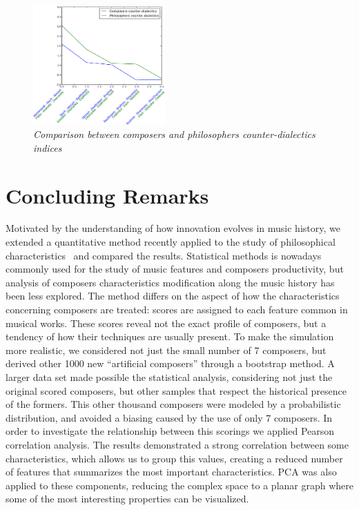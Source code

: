 \documentclass[
 aip,
 jmp,
 amsmath,amssymb,
 reprint,
]{revtex4-1}
\begin{document}
\begin{figure}[ht]
        \begin{center}
                \includegraphics[width=0.45\textwidth]{compara_dialeticas2}
        \end{center}
        \caption{\it Comparison between composers and philosophers
          counter-dialectics indices}
        \label{fig:comparingdialectics}
\end{figure}



\section{Concluding Remarks}

Motivated by the understanding of how innovation evolves in music
history, we extended a quantitative method
recently applied to the study of philosophical
characteristics~\cite{Fabbri} and compared the results. Statistical
methods is nowadays commonly used for the study of music features and
composers productivity, but analysis of
composers characteristics modification along the music history has been less
explored. The method differs on the
aspect of how the characteristics concerning composers are treated:
scores are assigned to each feature common in musical
works. These scores reveal not the
exact profile of composers, but a tendency of how their
techniques are usually present. To make the simulation more
realistic, we considered not just the small number of 7 composers, but
derived other 1000 new ``artificial composers'' through a bootstrap
method. A larger data set made possible the statistical analysis,
considering not just the original scored composers, but other samples
that respect the historical presence of the formers. This other thousand
composers were modeled by a
probabilistic distribution, and avoided a biasing caused by
the use of only 7 composers.
In order to investigate the
relationship between this scorings we applied Pearson correlation
analysis. The results demonstrated a strong correlation between some
characteristics, which allows us to group this values, creating a
reduced number of features that summarizes the most important
characteristics. PCA was also applied to these components, reducing
the complex space to a planar graph where some of the most interesting
properties can be visualized. 
\end{document}

